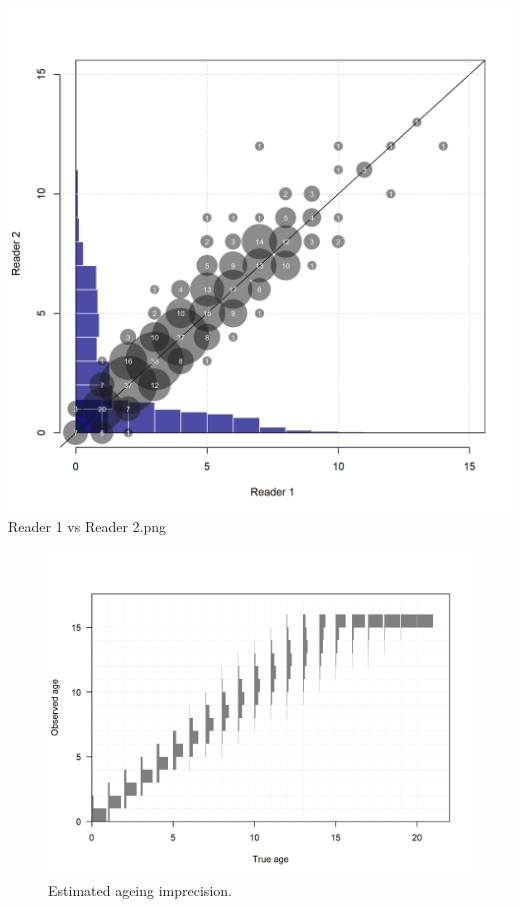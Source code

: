 \documentclass[12pt,]{article}
\begin{document}
\includegraphics{Figures/Reader 1 vs Reader 2.png} Reader 1 vs Reader
2.png

\begin{figure}
\centering
\includegraphics{r4ss/plots_mod1/numbers10_ageerror_matrix_1.png}
\caption{Estimated ageing imprecision.\label{fig:ageing_imprecision}}
\end{figure}
\end{document}
